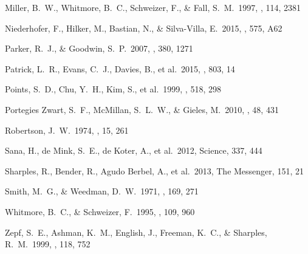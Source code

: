 \documentclass[useAMS,usenatbib]{mn2e}
\begin{document}
\begin{thebibliography}{99}
 Miller, B.~W., Whitmore,
B.~C., Schweizer, F., \& Fall, S.~M.\ 1997, \aj, 114, 2381

 Niederhofer, F., Hilker, M., Bastian, N., \& Silva-Villa, E.\ 2015, \aap, 575, A62

 Parker, R.~J., \& Goodwin, S.~P.\ 2007, \mnras, 380, 1271

 Patrick, L.~R., Evans,
C.~J., Davies, B., et al.\ 2015, \apj, 803, 14

 Points, S.~D., Chu,
Y.~H., Kim, S., et al.\ 1999, \apj, 518, 298

 Portegies Zwart, S.~F., McMillan, S.~L.~W., \& Gieles, M.\ 2010, \araa, 48, 431

 Robertson, J.~W.\ 1974, \aaps, 15, 261

 Sana, H., de Mink, S.~E.,
de Koter, A., et al.\ 2012, Science, 337, 444

 Sharples, R., Bender,
R., Agudo Berbel, A., et al.\ 2013, The Messenger, 151, 21

 Smith, M.~G., \& Weedman, D.~W.\ 1971, \apj, 169, 271

 Whitmore, B.~C., \& Schweizer, F.\ 1995, \aj, 109, 960

 Zepf, S.~E., Ashman,
K.~M., English, J., Freeman, K.~C., \& Sharples, R.~M.\ 1999, \aj, 118, 752
\end{thebibliography}
\label{lastpage}
\end{document}
